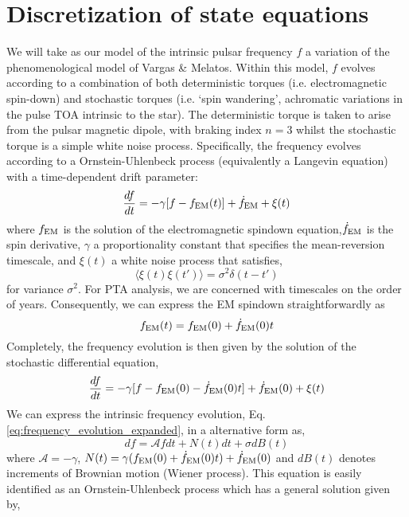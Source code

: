 \documentclass{tufte-handout} %
\begin{document}
\section{Discretization of state equations}
We will take as our model of the intrinsic pulsar frequency $f$ a variation of the phenomenological model of Vargas \& Melatos. Within this model, $f$ evolves according to a combination of both deterministic torques (i.e. electromagnetic spin-down) and stochastic torques (i.e. `spin wandering', achromatic variations in the pulse TOA intrinsic to the star). The deterministic torque is taken to arise from the pulsar magnetic dipole, with braking index $n=3$ whilst the stochastic torque is a simple white noise process. Specifically, the frequency evolves according to a Ornstein-Uhlenbeck process (equivalently a Langevin equation) with a time-dependent drift parameter:
\begin{equation}
	\frac{df}{dt} = -\gamma	 [f - f_{\rm EM} (t)] + \dot{f}_{\rm EM} + \xi(t)
	\label{eq:frequency_evolution}
\end{equation}
where $f_{\rm EM}$ is the solution of the electromagnetic spindown equation,$\dot{f}_{\rm EM}$ is the spin derivative, $\gamma$ a proportionality constant that specifies the mean-reversion timescale, and $\xi(t)$ a white noise process that satisfies,
\begin{equation}
	\langle \xi(t) \xi(t') \rangle = \sigma^2 \delta(t - t')
\end{equation}
for variance $\sigma^2$. For PTA analysis, we are concerned with timescales on the order of years. Consequently, we can express the EM spindown straightforwardly as
\begin{equation}
	f_{\rm EM} (t) = f_{\rm EM}(0) + \dot{f}_{\rm EM} (0)t
\end{equation}  
Completely, the frequency evolution is then given by the solution of the stochastic differential equation,
\begin{equation}
	\frac{df}{dt} = -\gamma	 [f - f_{\rm EM}(0) - \dot{f}_{\rm EM} (0)t] + \dot{f}_{\rm EM} (0) + \xi(t)
	\label{eq:frequency_evolution_expanded}
\end{equation}
We can express the intrinsic frequency evolution, Eq. \ref{eq:frequency_evolution_expanded}, in a alternative form as,
\begin{equation}
	df = \mathcal{A} f dt + N(t) dt + \sigma dB(t)
	\label{eq:state1}
\end{equation}
where $\mathcal{A} = -\gamma$, $N(t) = \gamma(f_{\rm EM}(0) + \dot{f}_{\rm EM}(0) t) +\dot{f}_{\rm EM}(0)$ and $dB(t)$ denotes increments of Brownian motion (Wiener process). This equation is easily identified as an Ornstein-Uhlenbeck process which has a general solution given by,
\end{document}
